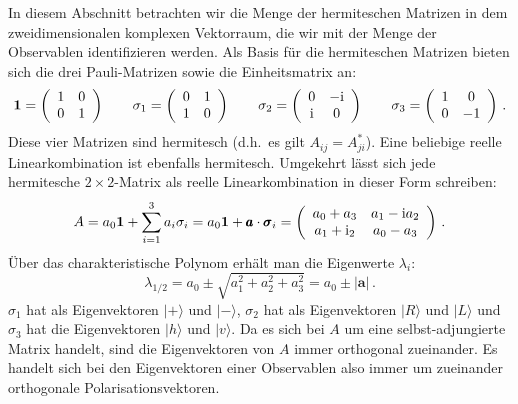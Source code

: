 In diesem Abschnitt betrachten wir die Menge 
der hermiteschen Matrizen in dem zweidimensionalen
komplexen Vektorraum, die wir mit der Menge der Observablen identifizieren werden. Als Basis f\"ur die hermiteschen
Matrizen bieten sich die drei Pauli-Matrizen sowie die Einheitsmatrix an:
\begin{equation}
   {\bf 1} = \left( \begin{array}{cc}  1 & 0 \\ 0 & 1 \end{array} \right)  \hspace{0.7cm}
   \sigma_1  = \left( \begin{array}{cc}  0 & 1 \\ 1 & 0 \end{array} \right)  \hspace{0.7cm}
   \sigma_2  = \left( \begin{array}{cc}  0 & -{\rm i} \\ {\rm i} & 0 \end{array} \right)  \hspace{0.7cm}
   \sigma_3 = \left( \begin{array}{cc}  1 & 0 \\ 0 & -1 \end{array} \right)  \, .
\end{equation}
Diese vier Matrizen sind hermitesch (d.h.\ es gilt $A_{ij}=A^*_{ji}$). Eine beliebige reelle Linearkombination
ist ebenfalls hermitesch. Umgekehrt l\"asst sich jede hermitesche $2\times 2$-Matrix als reelle Linearkombination
in dieser Form schreiben:
\begin{equation}
      A = a_0 {\bf 1} + \sum_{i=1}^3 a_i \sigma_i = a_0 {\bf 1} + \pmb{a} \cdot \pmb{\sigma}_i
         =     \left( \begin{array}{cc}  a_0 + a_3 & a_1-{\rm i}a_2 \\ a_1 + {\rm i}_2 &  a_0 - a_3 \end{array} \right) \, .
\end{equation} 
\"Uber das charakteristische Polynom erh\"alt man die Eigenwerte $\lambda_i$:
\begin{equation}
\label{eq_QM1_Eigenwerte}
           \lambda_{1/2} = a_0 \pm \sqrt{a_1^2 + a_2^2 + a_3^2} = a_0 \pm | \pmb{a} |  \, .
\end{equation} 
$\sigma_1$ hat als Eigenvektoren $|+\rangle$ und $|-\rangle$, $\sigma_2$ hat als Eigenvektoren
$|R\rangle$ und $|L\rangle$ und $\sigma_3$ hat die Eigenvektoren $|h\rangle$ und $|v\rangle$. Da es
sich bei $A$ um eine selbst-adjungierte Matrix handelt, sind die Eigenvektoren von $A$ immer orthogonal
zueinander. Es handelt sich bei den Eigenvektoren einer Observablen also immer um zueinander orthogonale 
Polarisationsvektoren.

